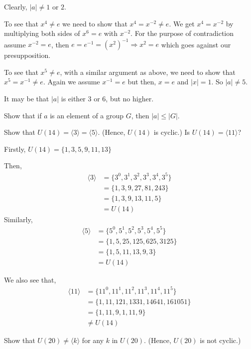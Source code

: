\documentclass[11pt,largemargins]{homework}
\begin{document}
\quad Clearly, $|a|\neq1\text{ or }2$. 

\quad To see that $x^4\neq e$ we need to show that $x^4=x^{-2}\neq e$. We get $x^4=x^{-2}$ by multiplying both sides of 
$x^6=e$ with $x^{-2}$. For the purpose of contradiction 
assume $x^{-2}=e$, then $e=e^{-1}=(x^2)^{-1}\Rightarrow x^2=e$ which goes against our presupposition.

\quad To see that $x^5\neq e$, with a similar argument as above, we need to show that $x^5=x^{-1}\neq e$.
Again we assume $x^{-1}=e$ but then, $x=e$ and $|x|=1$. So $|a|\neq 5$.

\quad It may be that $|a|$ is either 3 or 6, but no higher.

\question
Show that if $a$ is an element of a group $G$, then $|a|\leq |G|$.

\question
Show that $U(14)=\langle 3 \rangle = \langle 5 \rangle$. (Hence, $U(14)$ is cyclic.) Is $U(14)=\langle 11 \rangle$?

\quad Firstly, $U(14)=\{1,3,5,9,11,13\}$

\quad Then, 
\begin{align*}
    \langle 3\rangle &= \{3^0,3^1,3^2,3^3,3^4,3^5\}\\
                     &= \{1,3,9,27,81,243\}\\
                     &= \{1,3,9,13,11,5\}\\
                     &= U(14)
\end{align*}
\quad Similarly, 
\begin{align*}
    \langle 5\rangle &= \{5^0,5^1,5^2,5^3,5^4,5^5\}\\
                     &= \{1,5,25,125,625,3125\}\\
                     &= \{1,5,11,13,9,3\}\\
                     &= U(14)
\end{align*}

\quad We also see that,
\begin{align*}
    \langle 11\rangle &= \{11^0,11^1,11^2,11^3,11^4,11^5\}\\
                      &= \{1,11,121,1331,14641,161051\}\\
                      &= \{1,11,9,1,11,9\}\\
                      &\neq U(14)
\end{align*}

\question
Show that $U(20)\neq \langle k \rangle$ for any $k$ in $U(20)$. (Hence, $U(20)$ is not cyclic.)
\end{document}
